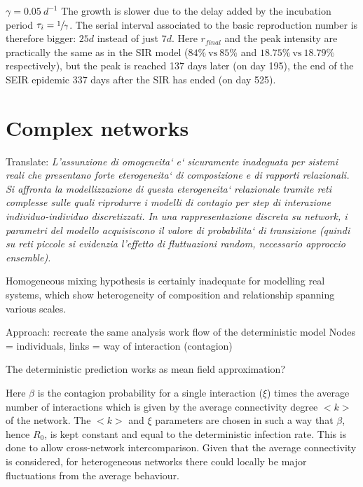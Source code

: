 \documentclass[DIV=12, BCOR=0pt]{scrartcl}  %
\begin{document}
	
	$\gamma = 0.05 \ d^{-1}$ The growth is slower due to the delay added by the incubation period $\tau_{i}=\sfrac{1}{\gamma}$. The serial interval associated to the basic reproduction number is therefore bigger: $25 d$ instead of just $7 d$. Here $r_{final}$ and the peak intensity are practically the same as in the SIR model ($84 \% \ \mathrm{vs} \ 85 \%$ and $18.75 \% \ \mathrm{vs} \ 18.79 \% \ $ respectively), but the peak is reached 137 days later (on day 195), the end of the SEIR epidemic 337 days after the SIR has ended (on day 525). %
  
  
  
  \section{Complex networks}
  Translate: \textit{L'assunzione di omogeneita` e` sicuramente inadeguata per sistemi reali che presentano forte eterogeneita` di composizione e di rapporti relazionali. Si affronta la modellizzazione di questa eterogeneita` relazionale tramite reti complesse sulle quali riprodurre i modelli di contagio per step di interazione individuo-individuo discretizzati. In una rappresentazione discreta su network, i parametri del modello acquisiscono il valore di probabilita` di transizione (quindi su reti piccole si evidenzia l'effetto di fluttuazioni random, necessario approccio ensemble).  }
  
  Homogeneous mixing hypothesis is certainly inadequate for modelling real systems, which show heterogeneity of composition and relationship spanning various scales. 
  
  
  
  
  Approach: recreate the same analysis work flow of the deterministic model
  Nodes = individuals, links = way of interaction (contagion)
  
  The deterministic prediction works as mean field approximation?
  
  Here $\beta$ is the contagion probability for a single interaction ($\xi$) times the average number of interactions which is given by the average connectivity degree $<k>$ of the network. The $<k>$ and $\xi$ parameters are chosen in such a way that $\beta$, hence $R_0$, is kept constant and equal to the deterministic infection rate. This is done to allow cross-network intercomparison. Given that the average connectivity is considered, for heterogeneous networks there could locally be major fluctuations from the average behaviour.
  
\end{document}
